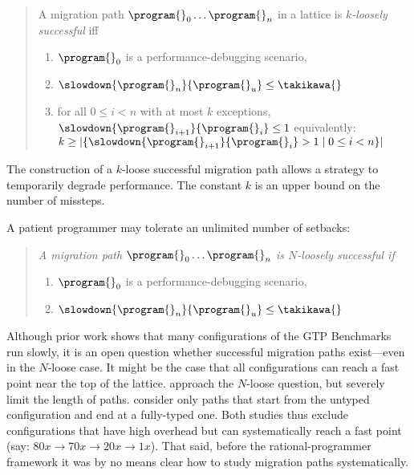 \begin{quote} \em

A migration path ${\program{}_0} \ldots {\program{}_n}$ in a
lattice  is \emph{$k$-loosely successful}
iff 
\begin{enumerate}
  \item  $\program{}_0$ is a performance-debugging scenario,
  \item $\slowdown{\program{}_n}{\program{}_u} \leq \takikawa{}$  
  \item
      for all $0 \leq i < n$ with at most $k$ exceptions,
      $\slowdown{\program{}_{i+1}}{\program{}_{i}} \leq 1$
      \subitem equivalently: $k \geq |\{ \slowdown{\program{}_{i+1}}{\program{}_{i}} > 1 \mid 0 \leq i < n\}|$
  \end{enumerate} 
\end{quote}
The construction of a $k$-loose successful migration path allows a strategy to
temporarily degrade performance. The constant $k$ is an
upper bound on the number of missteps.

A patient programmer may tolerate an unlimited number of setbacks:

\begin{quote} \em
A migration path ${\program{}_0} \ldots {\program{}_n}$ is $N$-loosely successful if 
  \begin{enumerate}
  \item  $\program{}_0$ is a performance-debugging scenario,
  \item $\slowdown{\program{}_n}{\program{}_u} \leq \takikawa{}$  
  \end{enumerate}
\end{quote}

Although prior work shows that many configurations of the GTP Benchmarks
run slowly, it is an open question whether successful migration paths
exist---even in the $N$-loose case.
It might be the case that all configurations can reach a fast point near the
top of the lattice.
\citet{gtnffvf-jfp-2019} approach the $N$-loose question, but severely limit
the length of paths.
\citet{g-deep-shallow} consider only paths that start from the untyped
configuration and end at a fully-typed one.
Both studies thus exclude configurations that have high overhead but can
systematically reach a fast point (say: $80x \rightarrow 70x \rightarrow 20x
\rightarrow 1x$).
That said, before the rational-programmer framework it was by no means
clear how to study migration paths systematically.


